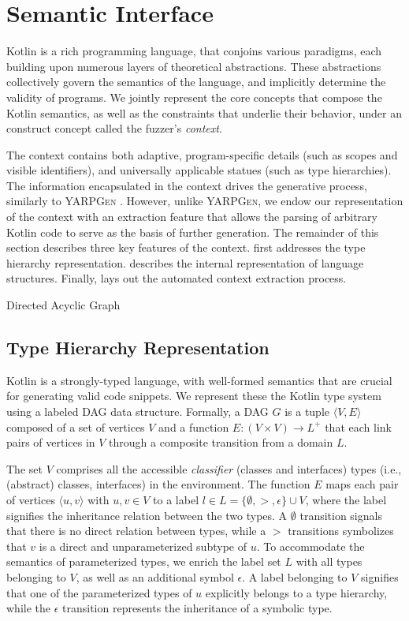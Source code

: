 \section{\label{sec:context}Semantic Interface}

Kotlin is a rich programming language, that conjoins various
paradigms, each building upon numerous layers of
theoretical abstractions.
These abstractions collectively govern the semantics
of the language, and implicitly determine the validity of programs.
We jointly represent the core concepts that compose the Kotlin
semantics, as well as the constraints that underlie their behavior,
under an construct concept called the fuzzer's \textit{context}.

The context contains both adaptive, program-specific details (such as scopes and
visible identifiers), and universally applicable statues (such as type hierarchies).
The information encapsulated in the context drives the generative
process, similarly to \textsc{YARPGen} \cite{manes2019art}.
However, unlike \textsc{YARPGen}, we endow our representation of the context
with an extraction feature that allows the parsing of arbitrary
Kotlin code to serve as the basis of further generation. 
The remainder of this section describes three key features of the context.
 first addresses the type hierarchy
representation.
 describes the internal representation
of language structures.
Finally,  lays out
the automated context extraction process.

 {Directed Acyclic Graph}

\subsection{\label{subsec:type-hierarchy}Type Hierarchy Representation}

Kotlin is a strongly-typed language, with well-formed semantics
that are crucial for generating valid code snippets.
We represent these the Kotlin type system using a labeled \Gls{DAG} data structure.
Formally, a \Gls{DAG} $G$ is a tuple $\langle V, E \rangle$ composed
of a set of vertices $V$ and a function $E : (V \times V) \to L^{+}$ that
each link pairs of vertices in $V$ through a composite transition from a domain $L$.

The set $V$ comprises all the accessible \textit{classifier} (classes and interfaces) types
(i.e., (abstract) classes, interfaces) in the environment.
The function $E$ maps each pair of vertices $\langle u, v \rangle$ with $u, v \in V$
to a label $l \in L = \{ \emptyset, >, \epsilon \} \cup V$, where the label signifies
the inheritance relation between the two types.
A $\emptyset$ transition signals that there is no direct relation between types, while
a $>$ transitions symbolizes that $v$ is a direct and unparameterized subtype of $u$.
To accommodate the semantics of parameterized types, we enrich the label set $L$
with all types belonging to $V$, as well as an additional symbol $\epsilon$.
A label belonging to $V$ signifies that one of the parameterized types of $u$
explicitly belongs to a type hierarchy, while the $\epsilon$ transition represents
the inheritance of a symbolic type.

